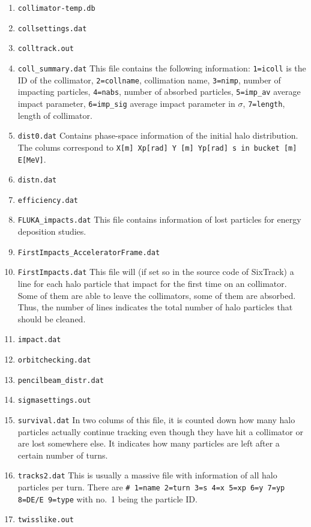 \documentclass[a4paper, oneside, final]{scrartcl}
\begin{document}
{{\begin{enumerate}
\item \texttt{collimator-temp.db}
\item \texttt{collsettings.dat}
\item \texttt{colltrack.out}

\item \texttt{coll\_summary.dat} This file contains the following information: \texttt{1=icoll} is the ID of the collimator, \texttt{2=collname}, collimation name, \texttt{3=nimp}, number of impacting particles, \texttt{4=nabs}, number of absorbed particles, \texttt{5=imp\_av} average impact parameter, \texttt{6=imp\_sig} average impact parameter in $\sigma$, \texttt{7=length}, length of collimator.

\item \texttt{dist0.dat} Contains phase-space information of the initial halo distribution. The colums correspond to \texttt{X[m]   Xp[rad]   Y [m]   Yp[rad]   s in bucket [m]  E[MeV]}.

\item \texttt{distn.dat}
\item \texttt{efficiency.dat} 

\item \texttt{FLUKA\_impacts.dat} This file contains information of lost particles for energy deposition studies. 

\item \texttt{FirstImpacts\_AcceleratorFrame.dat}
\item \texttt{FirstImpacts.dat} This file will (if set so in the source code of SixTrack) a line for each halo particle that impact for the first time on an collimator. Some of them are able to leave the collimators, some of them are absorbed. Thus, the number of lines indicates the total number of halo particles that should be cleaned.

\item \texttt{impact.dat}
\item \texttt{orbitchecking.dat}
\item \texttt{pencilbeam\_distr.dat}
\item \texttt{sigmasettings.out}
\item \texttt{survival.dat} In two colums of this file, it is counted down how many halo particles actually continue tracking even though they have hit a collimator or are lost somewhere else. It indicates how many particles are left after a certain number of turns.

\item \texttt{tracks2.dat} This is usually a massive file with information of all halo particles per turn. There are \texttt{\# 1=name 2=turn 3=s 4=x 5=xp 6=y 7=yp 8=DE/E 9=type} with no.~1 being the particle ID.
\item \texttt{twisslike.out}
\end{enumerate}


}}
\end{document}
